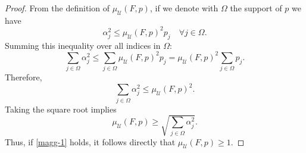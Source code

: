 \documentclass[10pt,a4paper]{amsart}
\begin{document}
\begin{proof}
  
From the definition of $ \mu_{\mathcal{U}}(F,p) $, if we denote with $\Omega$ the support of $p$ we have
    \begin{equation*}
        \alpha_j^2 \leq \mu_{\mathcal{U}}(F,p)^2 p_j \quad \forall j \in \Omega.
    \end{equation*}
    Summing this inequality over all indices in $\Omega$:
    \begin{equation*}
        \sum_{j \in \Omega} \alpha_j^2 \leq \sum_{j \in \Omega} \mu_{\mathcal{U}}(F,p)^2 p_j = \mu_{\mathcal{U}}(F,p)^2 \sum_{j \in \Omega} p_j.
    \end{equation*}
    Therefore,
    \begin{equation*}
        \sum_{j \in \Omega} \alpha_j^2 \leq \mu_{\mathcal{U}}(F,p)^2.
    \end{equation*}
    Taking the square root implies
    \begin{equation*}
        \mu_{\mathcal{U}}(F,p) \geq \sqrt{\sum_{j \in \Omega} \alpha_j^2}.
    \end{equation*}
    Thus, if \eqref{magg-1} holds, it follows directly that $\mu_{\mathcal{U}}(F,p) \geq 1$.
\end{proof}
\end{document}
